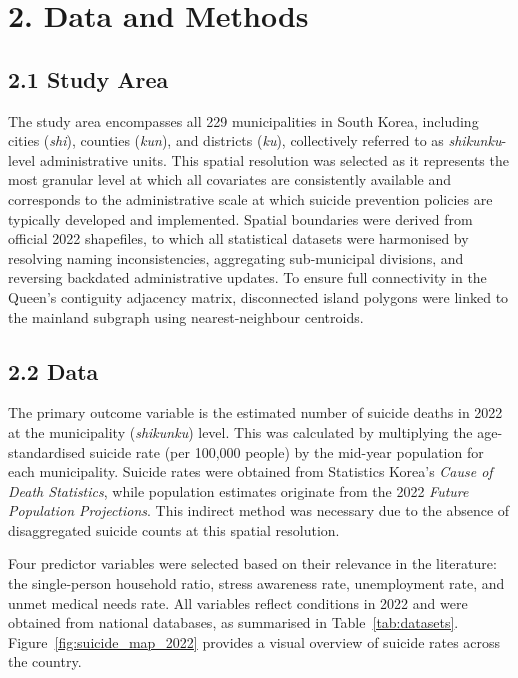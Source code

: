 \documentclass[11pt]{article}
\begin{document}
	\section*{2. Data and Methods}
	
	\subsection*{2.1 Study Area}	
	
	The study area encompasses all 229 municipalities in South Korea, including cities (\textit{shi}), counties (\textit{kun}), and districts (\textit{ku}), collectively referred to as \textit{shikunku}-level administrative units. This spatial resolution was selected as it represents the most granular level at which all covariates are consistently available and corresponds to the administrative scale at which suicide prevention policies are typically developed and implemented. Spatial boundaries were derived from official 2022 shapefiles, to which all statistical datasets were harmonised by resolving naming inconsistencies, aggregating sub-municipal divisions, and reversing backdated administrative updates. To ensure full connectivity in the Queen's contiguity adjacency matrix, disconnected island polygons were linked to the mainland subgraph using nearest-neighbour centroids.
	
	\subsection*{2.2 Data}
	
	The primary outcome variable is the estimated number of suicide deaths in 2022 at the municipality (\textit{shikunku}) level. This was calculated by multiplying the age-standardised suicide rate (per 100,000 people) by the mid-year population for each municipality. Suicide rates were obtained from Statistics Korea’s \textit{Cause of Death Statistics}, while population estimates originate from the 2022 \textit{Future Population Projections}. This indirect method was necessary due to the absence of disaggregated suicide counts at this spatial resolution.
		
	Four predictor variables were selected based on their relevance in the literature: the single-person household ratio, stress awareness rate, unemployment rate, and unmet medical needs rate. All variables reflect conditions in 2022 and were obtained from national databases, as summarised in Table~\ref{tab:datasets}. Figure~\ref{fig:suicide_map_2022} provides a visual overview of suicide rates across the country.
	
\end{document}
